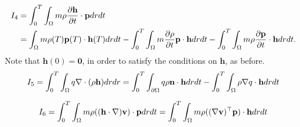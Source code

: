 \begin{align*}
I_4 &= \int_0^T \int_\Omega m \rho \frac{\partial \mathbf{h} }{\partial t} \cdot \mathbf{p} dr dt \\
&= \int_\Omega m \rho(T) \mathbf{p}(T) \cdot \mathbf{h}(T) dr dt - \int_0^T \int_\Omega  m\frac{\partial \rho}{\partial t} \mathbf{p} \cdot \mathbf{h} dr dt - \int_0^T \int_\Omega m \rho \frac{\partial \mathbf{p}}{\partial t} \cdot \mathbf{h} dr dt.
\end{align*}
Note that $\mathbf{h}(0)=\mathbf{0}$, in order to satisfy the conditions on $\mathbf{h}$, as before.
\begin{align*}
I_5= \int_0^T \int_\Omega q\nabla \cdot ( \rho \mathbf{h}) dr dr = \int_0^T \int_{\partial \Omega} q \rho  \mathbf{n}\cdot \mathbf{h} dr dt - \int_0^T \int_\Omega \rho\nabla q \cdot  \mathbf{h} dr dt
\end{align*}

\begin{align*}
I_6 = \int_0^T \int_\Omega m \rho ((\mathbf{h} \cdot \nabla)\mathbf{v} ) \cdot\mathbf{p} dr dt = \int_0^T \int_\Omega m \rho ((\nabla \mathbf{v})^\top\mathbf{p}) \cdot  \mathbf{h} dr dt
\end{align*}

